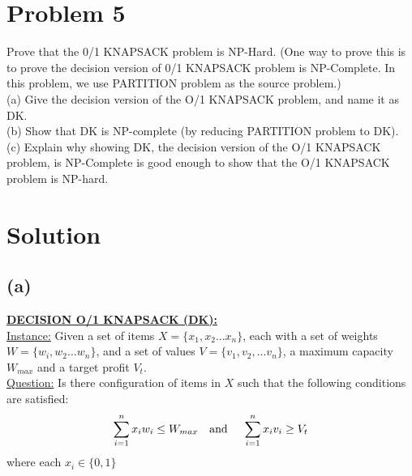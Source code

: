 
\section*{Problem 5}
	Prove that the 0/1 KNAPSACK problem is NP-Hard. (One way to prove this is to
	prove the decision version of 0/1 KNAPSACK problem is NP-Complete. In this problem,
	we use PARTITION problem as the source problem.)\\
	
	\noindent
	(a) Give the decision version of the O/1 KNAPSACK problem, and name it as DK.\\
	(b) Show that DK is NP-complete (by reducing PARTITION problem to DK).\\
	(c) Explain why showing DK, the decision version of the O/1 KNAPSACK problem, is
	NP-Complete is good enough to show that the O/1 KNAPSACK problem is NP-hard.
\vspace{-0.25cm}
\section*{Solution}
	\subsection*{(a)}
		\underline{\textbf{DECISION O/1 KNAPSACK (DK):}}\\
		
		\noindent
		\underline{Instance:} Given a set of items $X=\{x_1, x_2 \dots x_n\}$, each with a set of weights $W = \{w_i, w_2 \dots w_n\}$, and a set of values $V = \{v_1, v_2, \dots v_n\}$, a maximum capacity $W_{max}$ and a target profit $V_t$.\\
		
		\noindent
		\underline{Question:} Is there configuration of items in $X$ such that the following conditions are satisfied:
		\begin{equation*}
				\sum_{i=1}^{n} x_i w_i \leq W_{max} \text{\quad and \quad} \sum_{i=1}^{n} x_i v_i \geq V_t
		\end{equation*}
		where each $x_i \in\{0,1\}$
